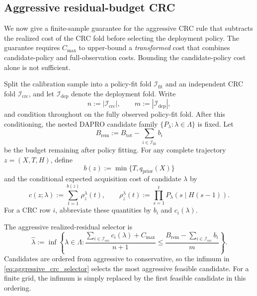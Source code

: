 
\subsection{Aggressive residual-budget CRC}
\label{sec:aggressive_crc_budget_validity}

We now give a finite-sample guarantee for the aggressive CRC rule that
subtracts the realized cost of the CRC fold before selecting the deployment
policy.  The guarantee requires $C_{\max}$ to upper-bound a
\emph{transformed} cost that combines candidate-policy and full-observation
costs.  Bounding the candidate-policy cost alone is not sufficient.

Split the calibration sample into a policy-fit fold
$\mathcal I_{\mathrm{fit}}$ and an independent CRC fold
$\mathcal I_{\mathrm{crc}}$, and let $\mathcal I_{\mathrm{dep}}$ denote the
deployment fold.  Write
\[
    n:=|\mathcal I_{\mathrm{crc}}|,
    \qquad
    m:=|\mathcal I_{\mathrm{dep}}|,
\]
and condition throughout on the fully observed policy-fit fold.  After this
conditioning, the nested DAPRO candidate family
$\{P_\lambda:\lambda\in\Lambda\}$ is fixed.  Let
\[
    B_{\mathrm{rem}}
    :=B_{\mathrm{tot}}
      -\sum_{i\in\mathcal I_{\mathrm{fit}}}b_i
\]
be the budget remaining after policy fitting.  For any complete trajectory
$z=(X,T,H)$, define
\[
    b(z):=\min\{T,q_{\mathrm{prior}}(X)\}
\]
and the conditional expected acquisition cost of candidate $\lambda$ by
\[
    c(z;\lambda)
    :=\sum_{t=1}^{b(z)}\rho_z^\lambda(t),
    \qquad
    \rho_z^\lambda(t)
    :=\prod_{s=1}^{t}P_\lambda(s\mid H(s-1)).
\]
For a CRC row $i$, abbreviate these quantities by $b_i$ and
$c_i(\lambda)$.

The aggressive realized-residual selector is
\begin{equation}
\label{eq:aggressive_crc_selector}
    \widehat\lambda
    :=\inf\left\{
        \lambda\in\Lambda:
        \frac{
            \sum_{i\in\mathcal I_{\mathrm{crc}}}c_i(\lambda)
            +C_{\max}
        }{n+1}
        \leq
        \frac{
            B_{\mathrm{rem}}
            -\sum_{i\in\mathcal I_{\mathrm{crc}}}b_i
        }{m}
    \right\}.
\end{equation}
Candidates are ordered from aggressive to conservative, so the infimum in
\eqref{eq:aggressive_crc_selector} selects the most aggressive feasible
candidate.  For a finite grid, the infimum is simply replaced by the first
feasible candidate in this ordering.


